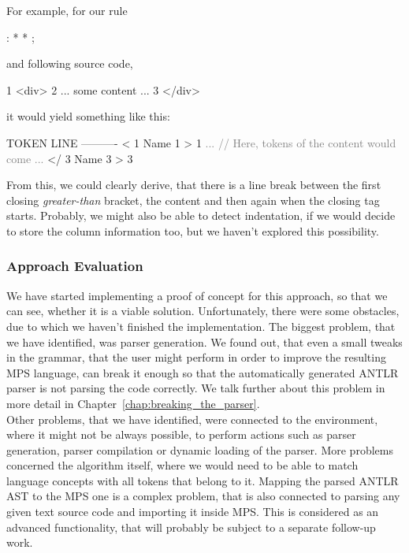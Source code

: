 \noindent
For example, for our  rule

\begin{antlr}
	  :   \literal{<}  * \literal{>} * \literal{</}  \literal{>} ;
\end{antlr}

\noindent
and following source code,

\begin{antlr}
	1   <div>
	2      ... some content ...
	3   </div>
\end{antlr}

\noindent
it would yield something like this:

\begin{antlr}
	TOKEN LINE
	----------
	<       1
	Name    1
	>       1
	\textcolor{gray}{...}
	\textcolor{gray}{// Here, tokens of the content would come}
	\textcolor{gray}{...}
	</      3
	Name    3
	>       3
\end{antlr}

From this, we could clearly derive, that there is a line break between the first closing \textit{greater-than} bracket, the content and then again when the closing tag starts.
Probably, we might also be able to detect indentation, if we would decide to store the column information too, but we haven't explored this possibility.

\subsubsection{Approach Evaluation}

We have started implementing a proof of concept for this approach, so that we can see, whether it is a viable solution.
Unfortunately, there were some obstacles, due to which we haven't finished the implementation.
The biggest problem, that we have identified, was parser generation.
We found out, that even a small tweaks in the grammar, that the user might perform in order to improve the resulting MPS language, can break it enough so that the automatically generated ANTLR parser is not parsing the code correctly.
We talk further about this problem in more detail in Chapter~\ref{chap:breaking_the_parser}.
\\

Other problems, that we have identified, were connected to the environment, where it might not be always possible, to perform actions such as parser generation, parser compilation or dynamic loading of the parser.
More problems concerned the algorithm itself, where we would need to be able to match language concepts with all tokens that belong to it.
Mapping the parsed ANTLR AST to the MPS one is a complex problem, that is also connected to parsing any given text source code and importing it inside MPS.
This is considered as an advanced functionality, that will probably be subject to a separate follow-up work.
\\


